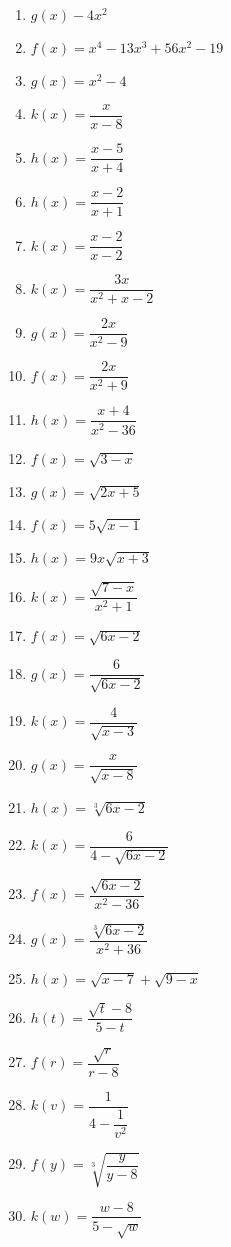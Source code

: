 \documentclass[12pt]{article}
\theoremstyle{definition}
\begin{document}
\begin{multicols}{2}
\begin{enumerate}
\item $g(x)-4x^2$
\item $f(x) = x^{4} - 13x^{3} + 56x^{2} - 19$
\item $g(x) = x^2 - 4$
\item $k(x) = \dfrac{x}{x - 8}$
\item $h(x)=\dfrac{x-5}{x+4}$
\item $h(x) = \dfrac{x-2}{x+1}$
\item $k(x) = \dfrac{x-2}{x-2}$  
\item $k(x) = \dfrac{3x}{x^2+x-2}$
\item $g(x) = \dfrac{2x}{x^2-9}$
\item $f(x) = \dfrac{2x}{x^2+9}$
\item $h(x) = \dfrac{x+4}{x^2 - 36}$
\item $f(x) = \sqrt{3-x}$
\item $g(x) = \sqrt{2x+5}$  
\item $f(x)=5\sqrt{x-1}$
\item $h(x) = 9x\sqrt{x+3}$
\item $k(x) = \dfrac{\sqrt{7-x}}{x^2+1}$  
\item  $f(x) = \sqrt{6x-2}$
\item  $g(x) = \dfrac{6}{\sqrt{6x-2}}$
\item $k(x)=\dfrac{4}{\sqrt{x-3}}$
\item $g(x) = \dfrac{x}{\sqrt{x - 8}}$
\item  $h(x) = \sqrt[3]{6x-2}$
\item  $k(x) = \dfrac{6}{4 - \sqrt{6x-2}}$
\item  $f(x) = \dfrac{\sqrt{6x-2}}{x^2-36}$
\item  $g(x) = \dfrac{\sqrt[3]{6x-2}}{x^2+36}$
\item $h(x) = \sqrt{x - 7} + \sqrt{9 - x}$
\item $h(t) = \dfrac{\sqrt{t} - 8}{5-t}$ 
\item $f(r) = \dfrac{\sqrt{r}}{r - 8}$
\item $k(v) = \dfrac{1}{4 - \dfrac{1}{v^{2}}}$
\item $f(y) = \sqrt[3]{\dfrac{y}{y - 8}}$
\item $k(w) = \dfrac{w - 8}{5 - \sqrt{w}}$
\end{enumerate}
\end{multicols}
\newpage
\ \newpage
\end{document}
